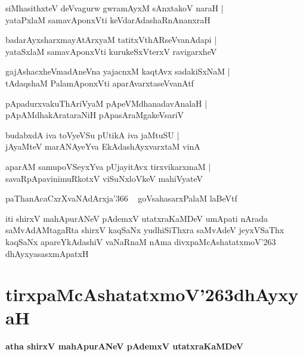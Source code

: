 \documentclass[twoside,12pt,openright]{book}
\def\S{\char'263}
\newcounter{shloka}[chapter]
\begin{document}
\begin{shloka}%
siMhasithxteV deVvagurw gwramAyxM sAnxtakoV naraH |\\
yataPxlaM samavAponxVti keVdarAdashaRnAnanxraH
\end{shloka}

\begin{shloka}%
badarAyxsharxmayAtArxyaM tatitxVthARseVvanAdapi |\\
yataSxlaM samavAponxVti kurukeSxVterxV ravigarxheV 
\end{shloka}

\begin{shloka}%
gajAshacxheVmadAneVna yajacnxM kaqtAvx sadakiSxNaM |\\
tAdaqshaM PalamAponxVti aparAvarxtaseVvanAtf
\end{shloka}

\begin{shloka}%
pApadurxvakuThAriVyaM pApeVMdhanadavAnalaH |\\
pApAMdhakArataraNiH pApasAraMgakeVsariV 
\end{shloka}

\begin{shloka}%
budabxdA iva toVyeVSu pUtikA iva jaMtuSU |\\
jAyaMteV marANAyeYva EkAdashAyxvarxtaM vinA
\end{shloka}

\begin{shloka}%
aparAM samupoVSeyxYva pUjayitAvx tirxvikarxmaM |\\
savaRpApavinimuRkotxV viSuNxloVkeV mahiVyateV 
\end{shloka}

\begin{shloka}%
paThanAcaCxrXvaNAdArxja\char'366 ~ goVsahasarxPalaM laBeVtf
\end{shloka}

\begin{center}
iti shirxV mahApurANeV pAdemxV utatxraKaMDeV umApati nArada saMvAdAMtagaRta shirxV kaqSaNx 
yudhiSiThxra saMvAdeV jeyxVSaThx kaqSaNx apareYkAdashiV vaNaRnaM nAma divxpaMcAshatatxmoV\S 
dhAyxyasasxmApatxH
\end{center}

\chapter{tirxpaMcAshatatxmoV\S dhAyxyaH}

\begin{center}
{\LARGE\bfseries atha shirxV mahApurANeV pAdemxV utatxraKaMDeV}
\end{center}
\end{document}
